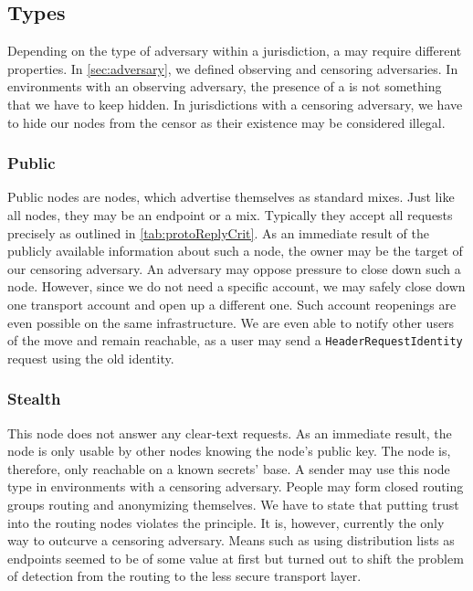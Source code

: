 \subsection{\VortexNode{} Types}\label{sec:vortexNodeTypes}
Depending on the type of adversary within a jurisdiction, a \VortexNode{} may require different properties. In \cref{sec:adversary}, we defined observing and censoring adversaries. In environments with an observing adversary, the presence of a \VortexNode{} is not something that we have to keep hidden. In jurisdictions with a censoring adversary, we have to hide our nodes from the censor as their existence may be considered illegal.

\subsubsection{Public \VortexNode}
Public nodes are nodes, which advertise themselves as standard mixes. Just like all nodes, they may be an endpoint or a mix. Typically they accept all requests precisely as outlined in \cref{tab:protoReplyCrit}. As an immediate result of the publicly available information about such a node, the owner may be the target of our censoring adversary. An adversary may oppose pressure to close down such a node. However, since we do not need a specific account, we may safely close down one transport account and open up a different one. Such account reopenings are even possible on the same infrastructure. We are even able to notify other users of the move and remain reachable, as a user may send a \texttt{HeaderRequestIdentity} request using the old identity. 

\subsubsection{Stealth \VortexNode}\label{sec:stealthNode}
This node does not answer any clear-text requests. As an immediate result, the node is only usable by other nodes knowing the node's public key. The node is, therefore, only reachable on a known secrets' base. A sender may use this node type in environments with a censoring adversary. People may form closed routing groups routing and anonymizing themselves. We have to state that putting trust into the routing nodes violates the  principle. It is, however, currently the only way to outcurve a censoring adversary. Means such as using distribution lists as endpoints seemed to be of some value at first but turned out to shift the problem of detection from the routing to the less secure transport layer.

